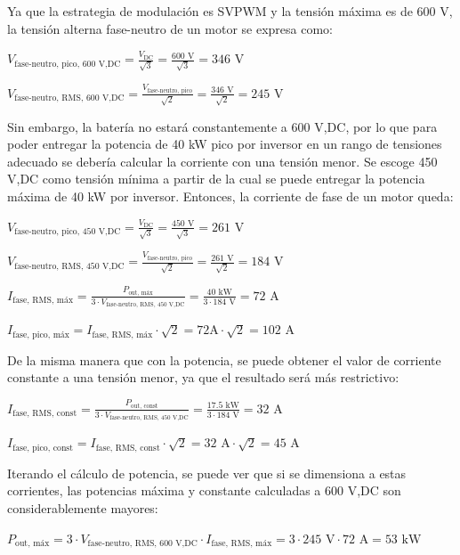 Ya que la estrategia de modulación es SVPWM y la tensión máxima es de 600 V, la tensión alterna fase-neutro de un motor se expresa como:

\(V_{\text{fase-neutro, pico, 600 V,DC}} = \frac{V_{\text{DC}}}{\sqrt{3}} = \frac{600 \text{ V}}{\sqrt{3}} = 346 \text{ V}\)

\(V_{\text{fase-neutro, RMS, 600 V,DC}} = \frac{V_{\text{fase-neutro, pico}}}{\sqrt{2}} = \frac{346 \text{ V}}{\sqrt{2}} = 245 \text{ V}\)

Sin embargo, la batería no estará constantemente a 600 V,DC, por lo que para poder entregar la potencia de 40 kW pico por inversor en un rango de tensiones adecuado se debería calcular la corriente con una tensión menor. Se escoge 450 V,DC como tensión mínima a partir de la cual se puede entregar la potencia máxima de 40 kW por inversor. Entonces, la corriente de fase de un motor queda:

\(V_{\text{fase-neutro, pico, 450 V,DC}} = \frac{V_{\text{DC}}}{\sqrt{3}} = \frac{450 \text{ V}}{\sqrt{3}} = 261 \text{ V}\)

\(V_{\text{fase-neutro, RMS, 450 V,DC}} = \frac{V_{\text{fase-neutro, pico}}}{\sqrt{2}} = \frac{261 \text{ V}}{\sqrt{2}} = 184 \text{ V}\)


\(I_{\text{fase, RMS, máx}} = \frac{P_{\text{out, máx}}}{3\cdot V_{\text{fase-neutro, RMS, 450 V,DC}}} = \frac{40 \text{ kW}}{3\cdot184 \text{ V}} = 72 \text{ A}\)

\(I_{\text{fase, pico, máx}} = I_{\text{fase, RMS, máx}}\cdot\sqrt{2} = 72\text{A} \cdot\sqrt{2} = 102 \text{ A}\)

De la misma manera que con la potencia, se puede obtener el valor de corriente constante a una tensión menor, ya que el resultado será más restrictivo:

\(I_{\text{fase, RMS, const}} = \frac{P_{\text{out, const}}}{3\cdot V_{\text{fase-neutro, RMS, 450 V,DC}}} = \frac{17.5 \text{ kW}}{3\cdot184 \text{ V}} = 32 \text{ A}\)

\(I_{\text{fase, pico, const}} = I_{\text{fase, RMS, const}}\cdot\sqrt{2} = 32 \text{ A}\cdot\sqrt{2} = 45 \text{ A}\)


Iterando el cálculo de potencia, se puede ver que si se dimensiona a estas corrientes, las potencias máxima y constante calculadas a 600 V,DC son considerablemente mayores:

\(P_{\text{out, máx}} = 3\cdot V_{\text{fase-neutro, RMS, 600 V,DC}}\cdot I_{\text{fase, RMS, máx}} = 3\cdot245 \text{ V}\cdot 72 \text{ A} = 53 \text{ kW}\)

